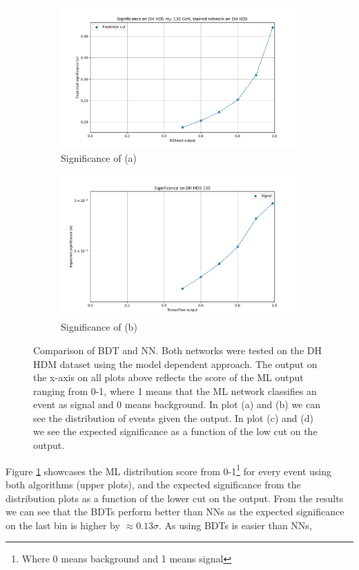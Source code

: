 \documentclass[12pt, a4paper]{book}
\begin{document}
\begin{figure}[!ht]
\begin{subfigure}[b]{0.49\textwidth}
      \centering
      \includegraphics[width=1\textwidth]{Pos_wgt/EXP_SIG.pdf}
      \caption{Significance of (a)}
   \end{subfigure}
   \graphicspath{{../../../Plots/NeuralNetwork/Padding/}}
   \begin{subfigure}[b]{0.49\textwidth}
      \centering
      \includegraphics[width=1\textwidth]{New_pad/EXP_SIG.pdf}
      \caption{Significance of (b)}
   \end{subfigure}
   \caption[Comparison of BDT and NN]{Comparison of BDT and NN. Both networks were tested on the DH HDM dataset using the model dependent approach. The output on the x-axis on all plots above reflects the score of the ML output ranging from 0-1, where 1 means that the ML network classifies an event as signal and 0 means background. In plot (a) and (b) we can see the distribution of events given the output. In plot (c) and (d) we see the expected significance as a function of the low cut on the output. }\label{fig:BDT_vs_NN}
\end{figure}
\noindent Figure \ref{fig:BDT_vs_NN} showcases the ML distribution score from 0-1\footnote{Where 0 means background and 1 means signal} for every event using both algorithms (upper plots), and the expected significance from the distribution plots as a function of the lower cut on the output. From the results we can see that the BDTs perform better than NNs as the expected significance on the last bin is higher by $\approx0.13\sigma$. As using BDTs is easier than NNs, 
\end{document}
